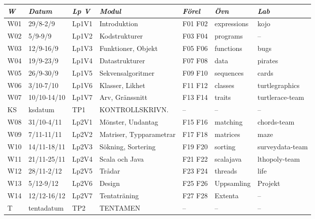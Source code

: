 \begin{tabular}{l|l|l|l|l|l|l}
\textit{W} & \textit{Datum} & \textit{Lp V} & \textit{Modul} & \textit{Förel} & \textit{Övn} & \textit{Lab} \\ \hline \hline
W01 & 29/8-2/9    & Lp1V1 & Introduktion            & F01 F02 & expressions & kojo            \\
W02 & 5/9-9/9     & Lp1V2 & Kodstrukturer           & F03 F04 & programs    & --              \\
W03 & 12/9-16/9   & Lp1V3 & Funktioner, Objekt      & F05 F06 & functions   & bugs            \\
W04 & 19/9-23/9   & Lp1V4 & Datastrukturer          & F07 F08 & data        & pirates         \\
W05 & 26/9-30/9   & Lp1V5 & Sekvensalgoritmer       & F09 F10 & sequences   & cards           \\
W06 & 3/10-7/10   & Lp1V6 & Klasser, Likhet         & F11 F12 & classes     & turtlegraphics  \\
W07 & 10/10-14/10 & Lp1V7 & Arv, Gränssnitt         & F13 F14 & traits      & turtlerace-team \\
KS  & ksdatum     & TP1   & KONTROLLSKRIVN.         & --      & --          & --              \\
W08 & 31/10-4/11  & Lp2V1 & Mönster, Undantag       & F15 F16 & matching    & chords-team     \\
W09 & 7/11-11/11  & Lp2V2 & Matriser, Typparametrar & F17 F18 & matrices    & maze            \\
W10 & 14/11-18/11 & Lp2V3 & Sökning, Sortering      & F19 F20 & sorting     & surveydata-team \\
W11 & 21/11-25/11 & Lp2V4 & Scala och Java          & F21 F22 & scalajava   & lthopoly-team   \\
W12 & 28/11-2/12  & Lp2V5 & Trådar                  & F23 F24 & threads     & life            \\
W13 & 5/12-9/12   & Lp2V6 & Design                  & F25 F26 & Uppsamling  & Projekt         \\
W14 & 12/12-16/12 & Lp2V7 & Tentaträning            & F27 F28 & Extenta     & --              \\
T   & tentadatum  & TP2   & TENTAMEN                & --      & --          & --              \\
\end{tabular}
